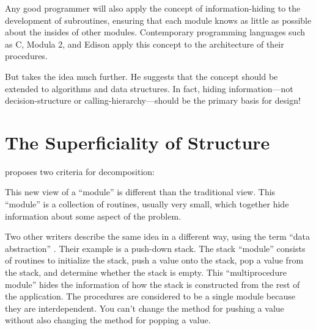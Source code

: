 Any good programmer will also apply the concept of information-hiding to
the development of subroutines, ensuring that each module knows as little
as possible about the insides of other modules. Contemporary programming
languages such as C, Modula 2, and Edison apply this concept to the
architecture of their procedures.

But %
takes the idea much further. He suggests that the concept should be
extended to algorithms and data structures.  In fact, hiding
information---not decision-structure or calling-hierarchy---should be
the primary basis for design!%
%
%
%

\section{The Superficiality of Structure}%
%

 proposes two criteria for
decomposition:

This new view of a ``module'' is different than the traditional
view. This ``module'' is a collection of routines, usually very
small, which together hide information about some aspect of the problem. 

Two other writers describe the same idea in a different way, using the
term ``data abstraction'' \cite{liskov75}%
.
Their example is a push-down stack. The stack ``module'' consists of
routines to initialize the stack, push a value onto the stack, pop a
value from the stack, and determine whether the stack is empty. This
``multiprocedure module''%
hides the information of how the stack is constructed from the rest of
the application. The procedures are considered to be a single module
because they are interdependent. You can't change the method for
pushing a value without also changing the method for popping a value.

